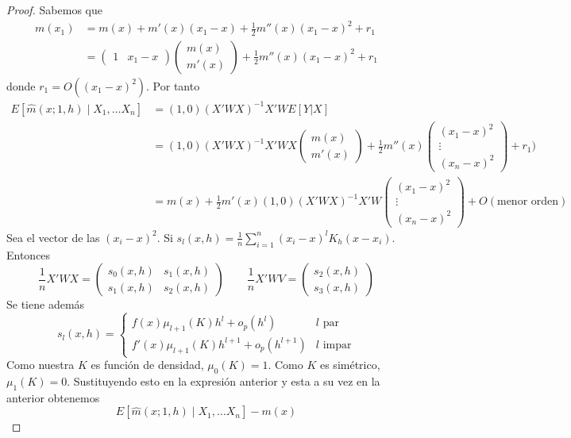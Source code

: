 \documentclass[MyPE.tex]{subfiles}
\begin{document}
\begin{proof} 
Sabemos que
\begin{align*}
m(x_1) &= m(x)+m'(x)(x_1-x)+\frac{1}{2}m''(x)(x_1-x)^2+r_1 \\
&=
\begin{pmatrix}
1 & x_1-x
\end{pmatrix}
\begin{pmatrix}
m(x)\\
m'(x)
\end{pmatrix}+\frac{1}{2}m''(x)(x_1-x)^2+r_1
\end{align*}
donde $r_1 = O((x_1-x)^2)$. Por tanto
\begin{align*}
E[\hat{m}(x;1,h)\mid X_1,\dotsc X_n] &= (1,0)(X'WX)^{-1}X'WE[Y|X]\\
&= 
(1,0)(X'WX)^{-1}X'W
X\begin{pmatrix}
m(x)\\
m'(x)
\end{pmatrix}+\frac{1}{2}m''(x)
\begin{pmatrix}
(x_1-x)^2\\
\vdots \\
(x_n-x)^2
\end{pmatrix}+r_1)\\
&=m(x) + \frac{1}{2}m'(x)(1,0)(X'WX)^{-1}X'W\begin{pmatrix}
(x_1-x)^2\\
\vdots \\
(x_n-x)^2
\end{pmatrix} + O(\text{menor orden})
\end{align*}
Sea el vector de las $(x_i-x)^2$. Si $s_l (x,h)=\frac{1}{n}\sum_{i=1}^n(x_i-x)^lK_h(x-x_i)$. Entonces
$$
\frac{1}{n}X'WX = \begin{pmatrix}
s_0(x,h) &s_1(x,h) \\
s_1(x,h) & s_2(x,h)
\end{pmatrix} \qquad \frac{1}{n}X'WV = \begin{pmatrix}
s_2(x,h)\\
s_3(x,h) 
\end{pmatrix}
$$
Se tiene además
$$
s_l(x,h) = \begin{cases}
f(x)\mu_{l+1}(K)h^l+o_p(h^l) & \text{$l$ par}\\
f'(x)\mu_{l+1}(K)h^{l+1}+o_p(h^{l+1})& \text{$l$ impar}
\end{cases}
$$
Como nuestra $K$ es función de densidad, $\mu_0(K)=1$. Como $K$ es simétrico, $\mu_1(K)=0$. Sustituyendo esto en la expresión anterior y esta a su vez en la anterior obtenemos 
$$
E[\hat{m}(x;1,h)\mid X_1,\dotsc X_n]-m(x)
$$
\end{proof}
\end{document}
